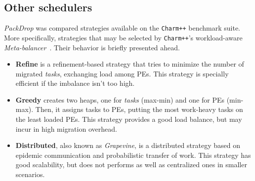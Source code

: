 \subsection{Other schedulers}

\textit{PackDrop} was compared strategies available on the \texttt{Charm++} benchmark suite.
More specifically, strategies that may be selected by \texttt{Charm++}'s workload-aware \textit{Meta-balancer}~\cite{MenonPHD}.
Their behavior is briefly presented ahead.

\begin{itemize}
	\item \textbf{Refine} is a refinement-based strategy that tries to minimize the number of migrated \textit{tasks}, exchanging load among PEs.
This strategy is specially efficient if the imbalance isn't too high.
	\item \textbf{Greedy} creates two heaps, one for \textit{tasks} (max-min) and one for PEs (min-max). 
Then, it assigns tasks to PEs, putting the most work-heavy tasks on the least loaded PEs.
This strategy provides a good load balance, but may incur in high migration overhead.
    \item \textbf{Distributed}, also known as \textit{Grapevine}, is a distributed strategy based on epidemic communication and probabilistic transfer of work.
   This strategy has good scalability, but does not performs as well as centralized ones in smaller scenarios.

\end{itemize}



